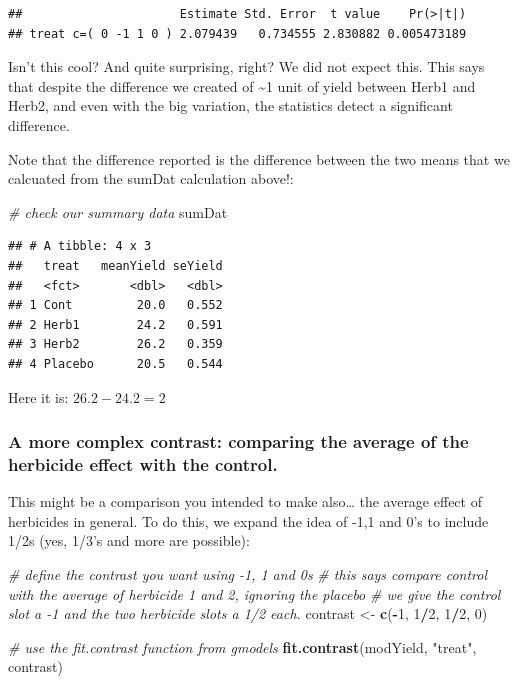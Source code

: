\documentclass[
]{book}
\newenvironment{Shaded}{\begin{snugshade}}{\end{snugshade}}
\newcommand{\CommentTok}[1]{\textcolor[rgb]{0.56,0.35,0.01}{\textit{#1}}}
\newcommand{\DecValTok}[1]{\textcolor[rgb]{0.00,0.00,0.81}{#1}}
\newcommand{\FunctionTok}[1]{\textcolor[rgb]{0.13,0.29,0.53}{\textbf{#1}}}
\newcommand{\NormalTok}[1]{#1}
\newcommand{\OtherTok}[1]{\textcolor[rgb]{0.56,0.35,0.01}{#1}}
\newcommand{\SpecialCharTok}[1]{\textcolor[rgb]{0.81,0.36,0.00}{\textbf{#1}}}
\newcommand{\StringTok}[1]{\textcolor[rgb]{0.31,0.60,0.02}{#1}}
\begin{document}
\begin{verbatim}
##                      Estimate Std. Error  t value    Pr(>|t|)
## treat c=( 0 -1 1 0 ) 2.079439   0.734555 2.830882 0.005473189
\end{verbatim}

Isn't this cool? And quite surprising, right? We did not expect this. This says that despite the difference we created of \textasciitilde1 unit of yield between Herb1 and Herb2, and even with the big variation, the statistics detect a significant difference.

Note that the difference reported is the difference between the two means that we calcuated from the sumDat calculation above!:

\begin{Shaded}
\begin{Highlighting}[]
\CommentTok{\# check our summary data}
\NormalTok{sumDat}
\end{Highlighting}
\end{Shaded}

\begin{verbatim}
## # A tibble: 4 x 3
##   treat   meanYield seYield
##   <fct>       <dbl>   <dbl>
## 1 Cont         20.0   0.552
## 2 Herb1        24.2   0.591
## 3 Herb2        26.2   0.359
## 4 Placebo      20.5   0.544
\end{verbatim}

Here it is: \(26.2 - 24.2 = 2\)

\subsubsection{A more complex contrast: comparing the average of the herbicide effect with the control.}\label{a-more-complex-contrast-comparing-the-average-of-the-herbicide-effect-with-the-control.}

This might be a comparison you intended to make also\ldots{} the average effect of herbicides in general. To do this, we expand the idea of -1,1 and 0's to include 1/2s (yes, 1/3's and more are possible):

\begin{Shaded}
\begin{Highlighting}[]
\CommentTok{\# define the contrast you want using {-}1, 1 and 0\textquotesingle{}s}
\CommentTok{\# this says compare control with the average of herbicide 1 and 2, ignoring the placebo}
\CommentTok{\# we give the control slot a {-}1 and the two herbicide slots a 1/2 each.}
\NormalTok{contrast }\OtherTok{\textless{}{-}} \FunctionTok{c}\NormalTok{(}\SpecialCharTok{{-}}\DecValTok{1}\NormalTok{, }\DecValTok{1}\SpecialCharTok{/}\DecValTok{2}\NormalTok{, }\DecValTok{1}\SpecialCharTok{/}\DecValTok{2}\NormalTok{, }\DecValTok{0}\NormalTok{)}

\CommentTok{\# use the fit.contrast function from gmodels}
\FunctionTok{fit.contrast}\NormalTok{(modYield, }\StringTok{"treat"}\NormalTok{, contrast)}
\end{Highlighting}
\end{Shaded}
\end{document}
